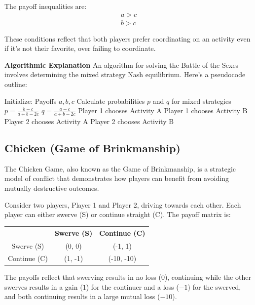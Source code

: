 \documentclass[12pt]{book} %
\begin{document}
The payoff inequalities are:
\begin{align}
a > c \\
b > c
\end{align}

These conditions reflect that both players prefer coordinating on an activity even if it's not their favorite, over failing to coordinate.

\textbf{Algorithmic Explanation}
An algorithm for solving the Battle of the Sexes involves determining the mixed strategy Nash equilibrium. Here's a pseudocode outline:
\FloatBarrier
\begin{algorithm}
\caption{Battle of the Sexes Strategy}
\begin{algorithmic}[1]
\State Initialize: Payoffs $a, b, c$
\State Calculate probabilities $p$ and $q$ for mixed strategies
\State $p = \frac{b-c}{a+b-2c}$
\State $q = \frac{a-c}{a+b-2c}$
    \State Player 1 chooses Activity A
\Else
    \State Player 1 chooses Activity B
\EndIf
{}
    \State Player 2 chooses Activity A
\Else
    \State Player 2 chooses Activity B
\EndIf
\end{algorithmic}
\end{algorithm}
\FloatBarrier

\subsection{Chicken (Game of Brinkmanship)}
The Chicken Game, also known as the Game of Brinkmanship, is a strategic model of conflict that demonstrates how players can benefit from avoiding mutually destructive outcomes.

Consider two players, Player 1 and Player 2, driving towards each other. Each player can either swerve (S) or continue straight (C). The payoff matrix is:

\begin{center}
\begin{tabular}{c|c|c}
 & Swerve (S) & Continue (C) \\ \hline
Swerve (S) & (0, 0) & (-1, 1) \\ \hline
Continue (C) & (1, -1) & (-10, -10) \\
\end{tabular}
\end{center}

The payoffs reflect that swerving results in no loss ($0$), continuing while the other swerves results in a gain ($1$) for the continuer and a loss ($-1$) for the swerved, and both continuing results in a large mutual loss ($-10$).
\end{document}
